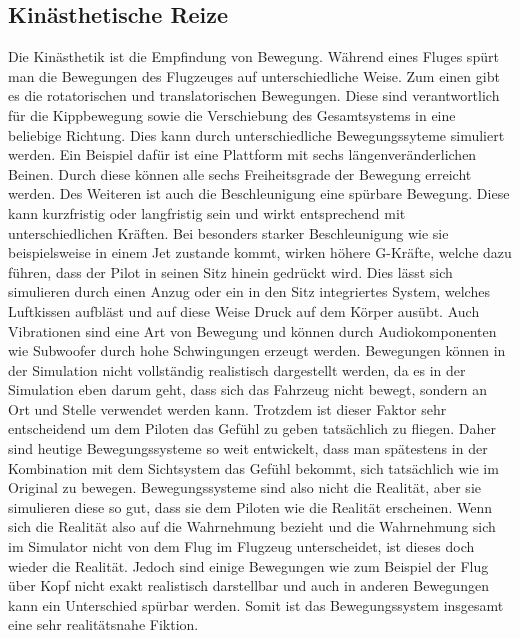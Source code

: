\documentclass[12pt]{article}
\begin{document}
\subsection{Kinästhetische Reize}
Die Kinästhetik ist die Empfindung von Bewegung. Während eines Fluges spürt man die Bewegungen des Flugzeuges auf unterschiedliche Weise. Zum einen gibt es die rotatorischen und translatorischen Bewegungen. Diese sind verantwortlich für die Kippbewegung sowie die Verschiebung des Gesamtsystems in eine beliebige Richtung. Dies kann durch unterschiedliche Bewegungssyteme simuliert werden. Ein Beispiel dafür ist eine Plattform mit sechs längenveränderlichen Beinen. Durch diese können alle sechs Freiheitsgrade der Bewegung erreicht werden.\newline
Des Weiteren ist auch die Beschleunigung eine spürbare Bewegung. Diese kann kurzfristig oder langfristig sein und wirkt entsprechend mit unterschiedlichen Kräften. Bei besonders starker Beschleunigung wie sie beispielsweise in einem Jet zustande kommt, wirken höhere G-Kräfte, welche dazu führen, dass der Pilot in seinen Sitz hinein gedrückt wird. Dies lässt sich simulieren durch einen Anzug oder ein in den Sitz integriertes System, welches Luftkissen aufbläst und auf diese Weise Druck auf dem Körper ausübt.\newline
Auch Vibrationen sind eine Art von Bewegung und können durch Audiokomponenten wie Subwoofer durch hohe Schwingungen erzeugt werden.\newline
Bewegungen können in der Simulation nicht vollständig realistisch dargestellt werden, da es in der Simulation eben darum geht, dass sich das Fahrzeug nicht bewegt, sondern an Ort und Stelle verwendet werden kann. Trotzdem ist dieser Faktor sehr entscheidend um dem Piloten das Gefühl zu geben tatsächlich zu fliegen. Daher sind heutige Bewegungssysteme so weit entwickelt, dass man spätestens in der Kombination mit dem Sichtsystem das Gefühl bekommt, sich tatsächlich wie im Original zu bewegen. Bewegungssysteme sind also nicht die Realität, aber sie simulieren diese so gut, dass sie dem Piloten wie die Realität erscheinen. Wenn sich die Realität also auf die Wahrnehmung bezieht und die Wahrnehmung sich im Simulator nicht von dem Flug im Flugzeug unterscheidet, ist dieses doch wieder die Realität. Jedoch sind einige Bewegungen wie zum Beispiel der Flug über Kopf nicht exakt realistisch darstellbar und auch in anderen Bewegungen kann ein Unterschied spürbar werden. Somit ist das Bewegungssystem insgesamt eine sehr realitätsnahe Fiktion.
\end{document}
